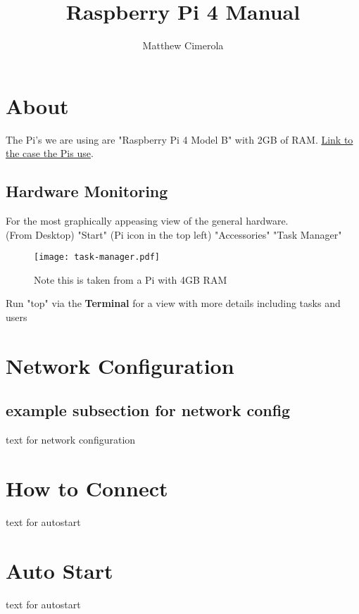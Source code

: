 \documentclass{article}
\author{Matthew Cimerola}
\title{Raspberry Pi 4 Manual}
\begin{document}
\maketitle

\tableofcontents
\newpage
\section{About}
The Pi's we are using are "Raspberry Pi 4 Model B" with 2GB of RAM. \href{https://www.amazon.com/Flirc-Raspberry-Pi-Case-Silver/dp/B07WG4DW52/ref=sr_1_5?keywords=Raspberry+Pi+4+Case&qid=1658852531&sr=8-5}{Link to the case the Pis use}. 
\subsection{Hardware Monitoring}
For the most graphically appeasing view of the general hardware.\\ 
(From Desktop) "Start" (Pi icon in the top left) \rightarrow "Accessories" \rightarrow "Task Manager" 

\begin{figure}[ht]
    \centering
    \texttt{[image: task-manager.pdf]}
    \caption{Note this is taken from a Pi with 4GB RAM}
\end{figure}
Run "top" via the \textbf{Terminal} for a view with more details including tasks and users


\newpage
\section{Network Configuration}
\subsection{example subsection for network config}
text for network configuration

\newpage
\section{How to Connect}
text for autostart


\newpage
\section{Auto Start}
text for autostart
\end{document}
